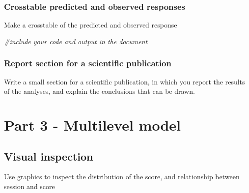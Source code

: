 \documentclass[]{article}
\newenvironment{Shaded}{\begin{snugshade}}{\end{snugshade}}
\newcommand{\KeywordTok}[1]{\textcolor[rgb]{0.13,0.29,0.53}{\textbf{#1}}}
\newcommand{\DataTypeTok}[1]{\textcolor[rgb]{0.13,0.29,0.53}{#1}}
\newcommand{\StringTok}[1]{\textcolor[rgb]{0.31,0.60,0.02}{#1}}
\newcommand{\CommentTok}[1]{\textcolor[rgb]{0.56,0.35,0.01}{\textit{#1}}}
\newcommand{\OtherTok}[1]{\textcolor[rgb]{0.56,0.35,0.01}{#1}}
\newcommand{\OperatorTok}[1]{\textcolor[rgb]{0.81,0.36,0.00}{\textbf{#1}}}
\newcommand{\NormalTok}[1]{#1}
\begin{document}
\subsubsection{Crosstable predicted and observed
responses}\label{crosstable-predicted-and-observed-responses}

Make a crosstable of the predicted and observed response

\begin{Shaded}
\begin{Highlighting}[]
\CommentTok{#include your code and output in the document}
\end{Highlighting}
\end{Shaded}

\subsubsection{Report section for a scientific
publication}\label{report-section-for-a-scientific-publication-3}

Write a small section for a scientific publication, in which you report
the results of the analyses, and explain the conclusions that can be
drawn.

\section{Part 3 - Multilevel model}\label{part-3---multilevel-model}

\subsection{Visual inspection}\label{visual-inspection-2}

Use graphics to inspect the distribution of the score, and relationship
between session and score

\begin{Shaded}
\end{Shaded}
\end{document}

